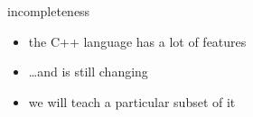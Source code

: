 \begin{frame}{incompleteness}
    \begin{itemize}
    \item the C++ language has a lot of features
    \item \ldots and is still changing
    \vspace{.5cm}
    \item we will teach a particular subset of it
    \end{itemize}
\end{frame}
